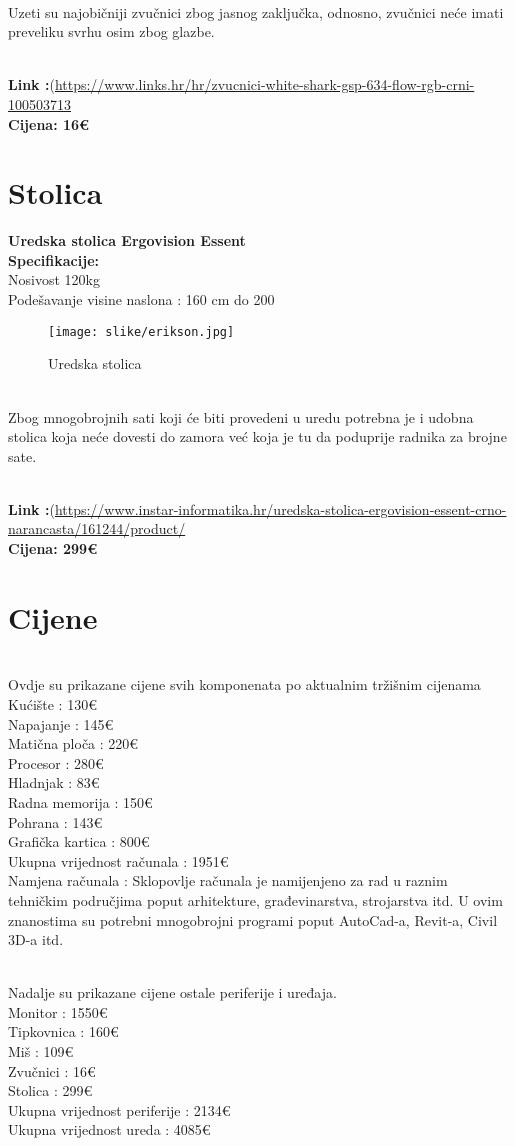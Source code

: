 \documentclass{article}
\begin{document}
\\ Uzeti su najobičniji zvučnici zbog jasnog zaključka, odnosno, zvučnici neće imati preveliku svrhu osim zbog glazbe. 

\\ \textbf{Link :}(\url{https://www.links.hr/hr/zvucnici-white-shark-gsp-634-flow-rgb-crni-100503713}
\\ \textbf{Cijena: 16€}

\newpage
\section{Stolica}
\textbf{Uredska stolica Ergovision Essent}
\\ \textbf{Specifikacije:}
\\Nosivost 120kg
\\Podešavanje visine naslona : 160 cm do 200

\begin{figure}[h!]
    \centering
    \texttt{[image: slike/erikson.jpg]}
    \caption{Uredska stolica}
    \label{fig:method}
\end{figure}


\\ Zbog mnogobrojnih sati koji će biti provedeni u uredu potrebna je i udobna stolica koja neće dovesti do zamora već koja je tu da poduprije radnika za brojne sate.

\\ \textbf{Link :}(\url{https://www.instar-informatika.hr/uredska-stolica-ergovision-essent-crno-narancasta/161244/product/}
\\ \textbf{Cijena: 299€}












\newpage
\section{Cijene}
\\Ovdje su prikazane cijene svih komponenata po aktualnim tržišnim cijenama
\\ Kućište : 130€
\\ Napajanje : 145€
\\ Matična ploča : 220€
\\ Procesor : 280€
\\ Hladnjak : 83€
\\ Radna memorija : 150€
\\ Pohrana : 143€
\\ Grafička kartica : 800€
\\ Ukupna vrijednost računala : 1951€
\\ Namjena računala : Sklopovlje računala je namijenjeno za rad u raznim tehničkim područjima poput arhitekture, građevinarstva, strojarstva itd. U ovim znanostima su potrebni mnogobrojni programi poput AutoCad-a, Revit-a, Civil 3D-a itd.

\\ Nadalje su prikazane cijene ostale periferije i uređaja.
\\Monitor : 1550€
\\Tipkovnica : 160€
\\ Miš : 109€
\\Zvučnici : 16€
\\Stolica : 299€
\\Ukupna vrijednost periferije : 2134€
\\Ukupna vrijednost ureda : 4085€
\end{document}
